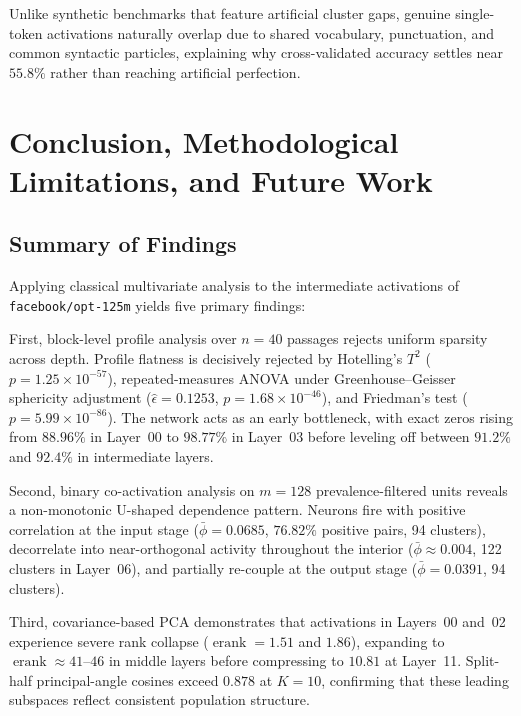 \documentclass[12pt, a4paper, oneside]{report}
\theoremstyle{definition}
\newcommand{\erank}{\operatorname{erank}}
\begin{document}
Unlike synthetic benchmarks that feature artificial cluster gaps, genuine single-token activations naturally overlap due to shared vocabulary, punctuation, and common syntactic particles, explaining why cross-validated accuracy settles near $55.8\%$ rather than reaching artificial perfection.

\chapter{Conclusion, Methodological Limitations, and Future Work}

\section{Summary of Findings}

Applying classical multivariate analysis to the intermediate activations of \texttt{facebook/opt-125m} yields five primary findings:

First, block-level profile analysis over $n = 40$ passages rejects uniform sparsity across depth. Profile flatness is decisively rejected by Hotelling's $T^2$ ($p = 1.25 \times 10^{-57}$), repeated-measures ANOVA under Greenhouse--Geisser sphericity adjustment ($\hat{\epsilon} = 0.1253$, $p = 1.68 \times 10^{-46}$), and Friedman's test ($p = 5.99 \times 10^{-86}$). The network acts as an early bottleneck, with exact zeros rising from $88.96\%$ in Layer~00 to $98.77\%$ in Layer~03 before leveling off between $91.2\%$ and $92.4\%$ in intermediate layers.

Second, binary co-activation analysis on $m = 128$ prevalence-filtered units reveals a non-monotonic U-shaped dependence pattern. Neurons fire with positive correlation at the input stage ($\bar{\phi} = 0.0685$, $76.82\%$ positive pairs, 94 clusters), decorrelate into near-orthogonal activity throughout the interior ($\bar{\phi} \approx 0.004$, 122 clusters in Layer~06), and partially re-couple at the output stage ($\bar{\phi} = 0.0391$, 94 clusters).

Third, covariance-based PCA demonstrates that activations in Layers~00 and~02 experience severe rank collapse ($\erank = 1.51$ and $1.86$), expanding to $\erank \approx 41\text{--}46$ in middle layers before compressing to $10.81$ at Layer~11. Split-half principal-angle cosines exceed $0.878$ at $K = 10$, confirming that these leading subspaces reflect consistent population structure.
\end{document}
